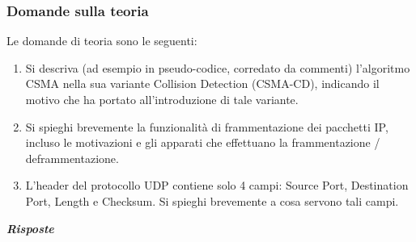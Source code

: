 \documentclass[a4paper]{article}
\begin{document}
	\subsubsection{Domande sulla teoria}
	Le domande di teoria sono le seguenti:
	\begin{enumerate}
		\item Si descriva (ad esempio in pseudo-codice, corredato da commenti) l'algoritmo CSMA nella sua variante Collision Detection (CSMA-CD), indicando il motivo che ha portato all'introduzione di tale variante.
		
		\item Si spieghi brevemente la funzionalità di frammentazione dei pacchetti IP, incluso le motivazioni e gli apparati che effettuano la frammentazione / deframmentazione.\label{frammentazione IP}
		
		\item L'header del protocollo UDP contiene solo 4 campi: Source Port, Destination Port, Length e Checksum. Si spieghi brevemente a cosa servono tali campi.
	\end{enumerate}
	\textcolor{Green4}{\textbf{\emph{Risposte}}}
\end{document}
